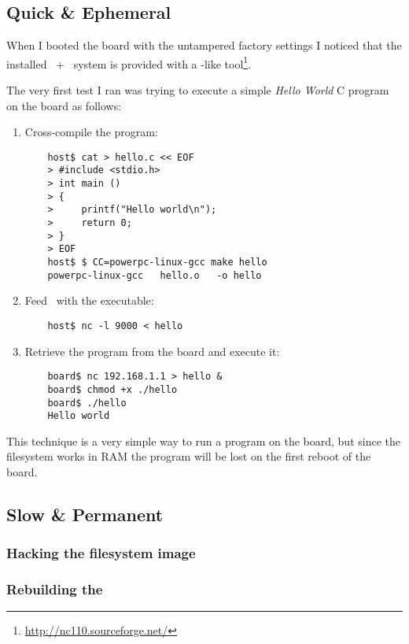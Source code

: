 \subsection{ Quick \& Ephemeral }

    When I booted the board with the untampered factory settings I
    noticed that the installed \BusyBox\ + \Linux\ system is
    provided with a \NetCat-like tool\footnote{
        \url{http://nc110.sourceforge.net/}
    }.

    The very first test I ran was trying to execute a simple
    \emph{Hello World} C program on the board as follows:
    \begin{enumerate}
    \item   Cross-compile the program:
\begin{lstlisting}
    host$ cat > hello.c << EOF
    > #include <stdio.h>
    > int main ()
    > {
    >     printf("Hello world\n");
    >     return 0;
    > }
    > EOF
    host$ $ CC=powerpc-linux-gcc make hello
    powerpc-linux-gcc   hello.o   -o hello
\end{lstlisting}
    \item   Feed \NetCat\ with the executable:
\begin{lstlisting}
    host$ nc -l 9000 < hello
\end{lstlisting}
    \item   Retrieve the program from the board and execute it:
\begin{lstlisting}
    board$ nc 192.168.1.1 > hello &
    board$ chmod +x ./hello
    board$ ./hello
    Hello world
\end{lstlisting}
    \end{enumerate}

    This technique is a very simple way to run a program on the
    board, but since the filesystem works in RAM the program will
    be lost on the first reboot of the board.

\subsection{ Slow \& Permanent }

    \subsubsection{ Hacking the filesystem image }

    \subsubsection{ Rebuilding the \InitRamFs }


